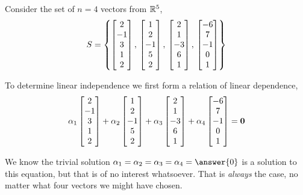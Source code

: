 \documentclass{ximera}
\begin{document}
\begin{example}%
Consider the set of $n=4$ vectors from $\mathbb{R}^{5}$,
\[
S=\left\{
\begin{bmatrix}2\\-1\\3\\1\\2\end{bmatrix},\,
\begin{bmatrix}1\\2\\-1\\5\\2\end{bmatrix},\,
\begin{bmatrix}2\\1\\-3\\6\\1\end{bmatrix},\,
\begin{bmatrix}-6\\7\\-1\\0\\1\end{bmatrix}
\right\}
\]

To determine linear independence we first form a relation of linear
dependence,
\[
\alpha_1\begin{bmatrix}2\\-1\\3\\1\\2\end{bmatrix}+
\alpha_2\begin{bmatrix}1\\2\\-1\\5\\2\end{bmatrix}+
\alpha_3\begin{bmatrix}2\\1\\-3\\6\\1\end{bmatrix}+
\alpha_4\begin{bmatrix}-6\\7\\-1\\0\\1\end{bmatrix}
=\mathbf{0}
\]

We know the trivial solution
$\alpha_1=\alpha_2=\alpha_3=\alpha_4=\answer{0}$ is a solution to this
equation, but that is of no interest whatsoever.  That is
\textit{always} the case, no matter what four vectors we might have
chosen.


\end{example}
\end{document}
